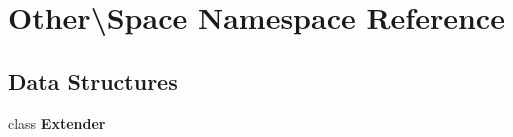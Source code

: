 \section{Other\textbackslash{}Space Namespace Reference}
\label{namespace_other_1_1_space}
\subsection*{Data Structures}
\begin{DoxyCompactItemize}
\item 
class {\bf Extender}
\end{DoxyCompactItemize}
